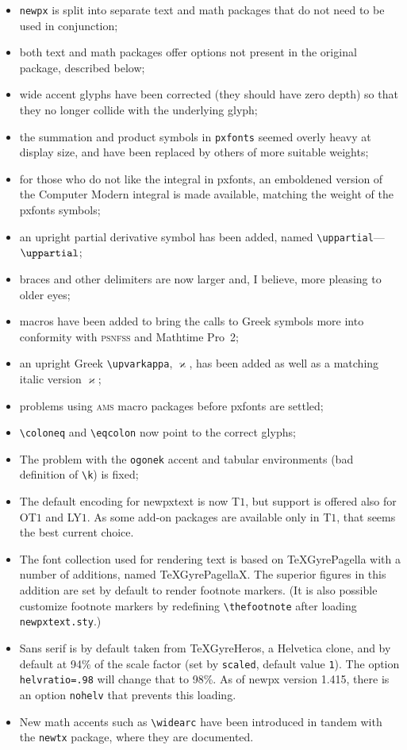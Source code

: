 \documentclass[11pt]{article}
\theoremstyle{oldplain}
\theoremstyle{plain}
\begin{document}
\begin{itemize}
\item
{\tt newpx} is split into separate text and math packages that do not need to be used in conjunction;
\item both text and math packages offer options not present in the original package, described below;
\item wide accent glyphs have been corrected (they should have zero depth) so that they no longer collide with the underlying glyph;
\item the summation and product symbols in {\tt pxfonts} seemed overly heavy at display size, and have been replaced by others of more suitable weights;
\item for those who do not like the integral in \textsf{pxfonts}, an emboldened version of the Computer Modern integral is made available, matching the weight of the \textsf{pxfonts} symbols;
\item an upright partial derivative symbol has been added, named \verb|\uppartial|---$\uppartial$;
\item 
braces and other delimiters are now larger and, I believe, more pleasing to older eyes;
\item macros have been added to bring the calls to Greek symbols more into conformity with \textsc{psnfss} and Mathtime Pro~2;
\item an upright Greek \verb|\upvarkappa|, $\upvarkappa$, has been added as well as a matching italic version $\varkappa$;
\item problems using \textsc{ams} macro packages before \textsf{pxfonts} are settled;
\item \verb|\coloneq| and \verb|\eqcolon| now point to the correct glyphs;
\item The problem with the {\tt ogonek} accent  and tabular environments (bad definition of \verb|\k|) is fixed;
\item The default encoding for \textsf{newpxtext} is now T$1$, but support is offered also for OT$1$ and LY$1$. As some add-on packages are available only in T$1$, that seems the best current choice.
\item The font collection used for rendering text is based on TeXGyrePagella with a number of additions, named TeXGyrePagellaX. The superior figures in this addition are set by default to render footnote markers. (It is also possible customize footnote markers by redefining \verb|\thefootnote| after loading {\tt newpxtext.sty}.) 
\item Sans serif is by default taken from TeXGyreHeros, a Helvetica clone, and by default at 94\% of the scale factor (set by {\tt scaled}, default value {\tt1}). The option {\tt helvratio=.98} will change that to 98\%. As of newpx version 1.415, there is an option {\tt nohelv} that prevents this loading.
\item New math accents such as \verb|\widearc| have been introduced in tandem with the {\tt newtx} package, where they are documented.
\end{itemize}
\end{document}
